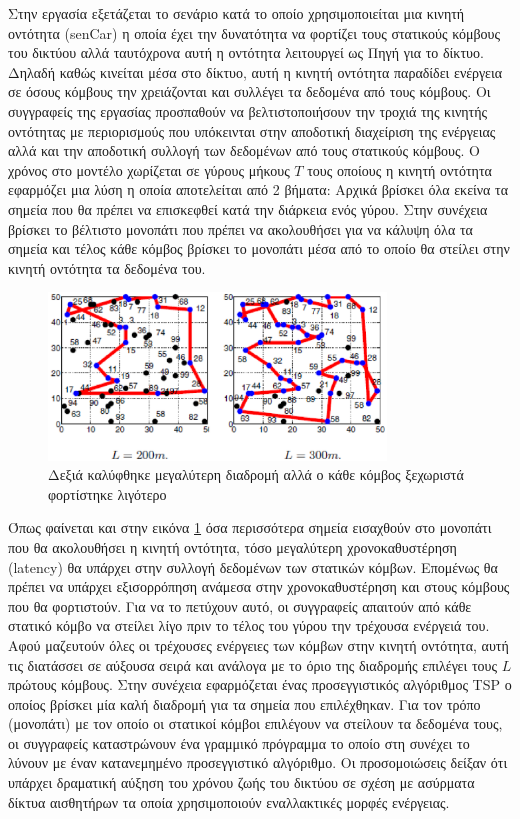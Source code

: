 Στην εργασία \cite{yuanyuan_joint} εξετάζεται το σενάριο κατά το οποίο χρησιμοποιείται μια κινητή οντότητα (senCar) η οποία έχει την δυνατότητα να φορτίζει τους
στατικούς κόμβους του δικτύου αλλά ταυτόχρονα αυτή η οντότητα λειτουργεί ως Πηγή για το δίκτυο. Δηλαδή καθώς κινείται μέσα στο δίκτυο, αυτή η κινητή οντότητα
παραδίδει ενέργεια σε όσους κόμβους την χρειάζονται και συλλέγει τα δεδομένα από τους κόμβους. Οι συγγραφείς της εργασίας προσπαθούν να βελτιστοποιήσουν την τροχιά
της κινητής οντότητας με περιορισμούς που υπόκεινται στην αποδοτική διαχείριση της ενέργειας αλλά και την αποδοτική συλλογή των δεδομένων από τους στατικούς
κόμβους. Ο χρόνος στο μοντέλο χωρίζεται σε γύρους μήκους $T$ τους οποίους η κινητή οντότητα εφαρμόζει μια λύση η οποία αποτελείται από 2 βήματα: Αρχικά βρίσκει όλα
εκείνα τα σημεία που θα πρέπει να επισκεφθεί κατά την διάρκεια ενός γύρου. Στην συνέχεια βρίσκει το βέλτιστο μονοπάτι που πρέπει να ακολουθήσει για να κάλυψη όλα τα
σημεία και τέλος κάθε κόμβος βρίσκει το μονοπάτι μέσα από το οποίο θα στείλει στην κινητή οντότητα τα δεδομένα του.

\begin{figure}[h]
	\centering
	\includegraphics[width=0.8\textwidth]{images/yuanyuan_recharg_paths.eps}
	\caption{Δεξιά καλύφθηκε μεγαλύτερη διαδρομή αλλά ο κάθε κόμβος ξεχωριστά φορτίστηκε λιγότερο}
	\label{fig:yuanyuan_recharg_paths}
\end{figure}
Όπως φαίνεται και στην εικόνα \ref{fig:yuanyuan_recharg_paths} όσα περισσότερα σημεία εισαχθούν στο μονοπάτι που θα ακολουθήσει η κινητή οντότητα, τόσο
μεγαλύτερη χρονοκαθυστέρηση (latency) θα υπάρχει στην συλλογή δεδομένων των στατικών κόμβων. Επομένως θα πρέπει να υπάρχει εξισορρόπηση ανάμεσα στην χρονοκαθυστέρηση
και στους κόμβους που θα φορτιστούν. Για να το πετύχουν αυτό, οι συγγραφείς απαιτούν από κάθε στατικό κόμβο να στείλει λίγο πριν το τέλος του γύρου την τρέχουσα
ενέργειά του. Αφού μαζευτούν όλες οι τρέχουσες ενέργειες των κόμβων στην κινητή οντότητα, αυτή τις διατάσσει σε αύξουσα σειρά και ανάλογα με το όριο της διαδρομής
επιλέγει τους $L$ πρώτους κόμβους. Στην συνέχεια εφαρμόζεται ένας προσεγγιστικός αλγόριθμος TSP ο οποίος βρίσκει μία καλή διαδρομή για τα σημεία που επιλέχθηκαν. Για
τον τρόπο (μονοπάτι) με τον οποίο οι στατικοί κόμβοι επιλέγουν να στείλουν τα δεδομένα τους, οι συγγραφείς καταστρώνουν ένα γραμμικό πρόγραμμα το οποίο στη συνέχει το
λύνουν με έναν κατανεμημένο προσεγγιστικό αλγόριθμο. Οι προσομοιώσεις δείξαν ότι υπάρχει δραματική αύξηση του χρόνου ζωής του δικτύου σε σχέση με ασύρματα δίκτυα
αισθητήρων τα οποία χρησιμοποιούν εναλλακτικές μορφές ενέργειας.


